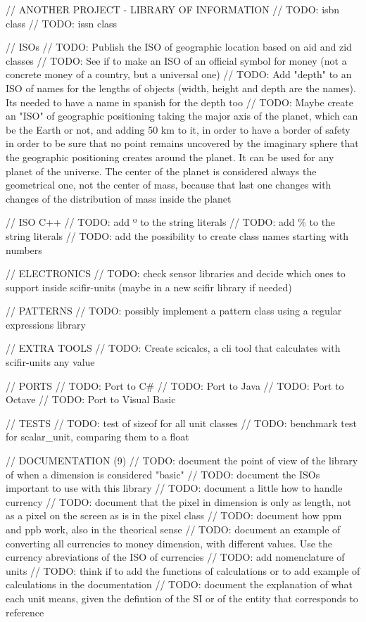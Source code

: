 // ANOTHER PROJECT -\/ LIBRARY OF INFORMATION // TODO\+: isbn class // TODO\+: issn class

// ISOs // TODO\+: Publish the ISO of geographic location based on aid and zid classes // TODO\+: See if to make an ISO of an official symbol for money (not a concrete money of a country, but a universal one) // TODO\+: Add "{}depth"{} to an ISO of names for the lengths of objects (width, height and depth are the names). It\textquotesingle{}s needed to have a name in spanish for the depth too // TODO\+: Maybe create an "{}\+ISO"{} of geographic positioning taking the major axis of the planet, which can be the Earth or not, and adding 50 km to it, in order to have a border of safety in order to be sure that no point remains uncovered by the imaginary sphere that the geographic positioning creates around the planet. It can be used for any planet of the universe. The center of the planet is considered always the geometrical one, not the center of mass, because that last one changes with changes of the distribution of mass inside the planet

// ISO C++ // TODO\+: add º to the string literals // TODO\+: add \% to the string literals // TODO\+: add the possibility to create class names starting with numbers

// ELECTRONICS // TODO\+: check sensor libraries and decide which ones to support inside scifir-\/units (maybe in a new scifir library if needed)

// PATTERNS // TODO\+: possibly implement a pattern class using a regular expressions library

// EXTRA TOOLS // TODO\+: Create scicalcs, a cli tool that calculates with scifir-\/units any value

// PORTS // TODO\+: Port to C\# // TODO\+: Port to Java // TODO\+: Port to Octave // TODO\+: Port to Visual Basic

// TESTS // TODO\+: test of sizeof for all unit classes // TODO\+: benchmark test for scalar\+\_\+unit, comparing them to a float

// DOCUMENTATION (9) // TODO\+: document the point of view of the library of when a dimension is considered "{}basic"{} // TODO\+: document the ISOs important to use with this library // TODO\+: document a little how to handle currency // TODO\+: document that the pixel in dimension is only as length, not as a pixel on the screen as is in the pixel class // TODO\+: document how ppm and ppb work, also in the theorical sense // TODO\+: document an example of converting all currencies to money dimension, with different values. Use the currency abreviations of the ISO of currencies // TODO\+: add nomenclature of units // TODO\+: think if to add the functions of calculations or to add example of calculations in the documentation // TODO\+: document the explanation of what each unit means, given the defintion of the SI or of the entity that corresponds to reference

